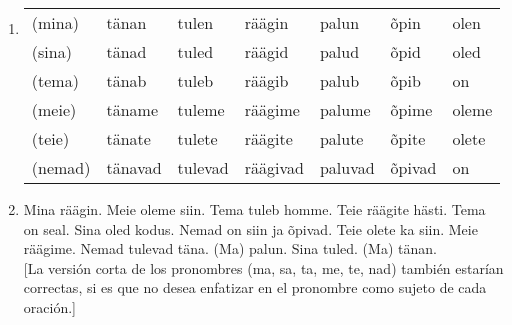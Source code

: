 \begin{enumerate}
\item 
\begin{tabular}{ l l l l l l l }
	(mina)	& tänan		& tulen		& räägin	& palun		& õpin		& olen \\
	(sina)	& tänad		& tuled		& räägid	& palud		& õpid		& oled \\
	(tema)	& tänab		& tuleb		& räägib	& palub		& õpib		& on \\
	(meie)	& täname	& tuleme	& räägime	& palume	& õpime		& oleme \\
	(teie)	& tänate	& tulete	& räägite	& palute	& õpite		& olete \\
	(nemad)	& tänavad	& tulevad	& räägivad	& paluvad	& õpivad	& on 
\end{tabular}
\item Mina räägin. Meie oleme siin. Tema tuleb homme. Teie räägite hästi. Tema on seal. Sina oled kodus. Nemad on siin ja õpivad. Teie olete ka siin. Meie räägime. Nemad tulevad täna. (Ma) palun. Sina tuled. (Ma) tänan.\\

[La versión corta de los pronombres (ma, sa, ta, me, te, nad) también estarían correctas, si es que no desea enfatizar en el pronombre como sujeto de cada oración.]
\end{enumerate}

